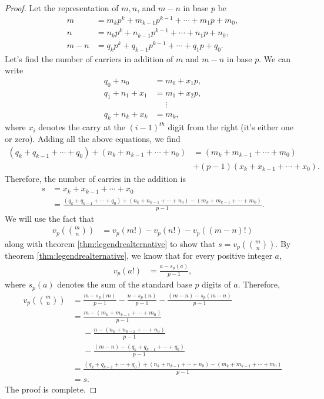 \documentclass[12pt]{subfile}
\begin{document}
\begin{proof}
	Let the representation of $m, n$, and $m-n$ in base $p$ be
	\begin{align*}
	m   &= m_kp^k+m_{k-1}p^{k-1}+\cdots +m_1p+m_0,\\
	n   &= n_kp^k+n_{k-1}p^{k-1}+\cdots +n_1p+n_0,\\
	m-n &= q_kp^k+q_{k-1}p^{k-1}+\cdots +q_1p+q_0.
	\end{align*}
	Let's find the number of carriers in addition of $m$ and $m-n$ in base $p$. We can write
	\begin{align*}
	q_0+n_0  &= m_0 + x_1 p,\\
	q_1+n_1+x_1&= m_1 + x_2p,\\
	&\phantom{=}\vdots\\
	q_k+n_k+x_k&= m_k,
	\end{align*}
	where $x_i$ denotes the carry at the $(i-1)^{th}$ digit from the right (it's either one or zero). Adding all the above equations, we find
	\begin{align*}
	(q_k+q_{k-1}+\cdots+q_0)+(n_k+n_{k-1}+\cdots+n_0) &= (m_k+m_{k-1}+ \cdots+m_0)\\&+(p-1)(x_k+x_{k-1}+\cdots+x_0).
	\end{align*}
	Therefore, the number of carries in the addition is
	\begin{align*}
	s &= x_k+x_{k-1}+\cdots+x_0 \\
	&= \frac{(q_k+q_{k-1}+\cdots+q_0) + (n_k+n_{k-1}+\cdots+n_0) - (m_k+m_{k-1}+\cdots+m_0)}{p-1}.
	\end{align*}
	We will use the fact that 
	\begin{align*}
	v_p\left( \binom{m}{n}\right) &= v_p(m!)-v_p(n!)-v_p((m-n)!)
	\end{align*}
	along with theorem \eqref{thm:legendrealternative} to show that $s=v_p\left( \binom{m}{n}\right)$. By theorem \eqref{thm:legendrealternative}, we know that for every positive integer $a$,
	\begin{align*}
	v_p(a!) & =\frac{a-s_p(a)}{p-1},
	\end{align*}
	where $s_p(a)$ denotes the sum of the standard base $p$ digits of $a$. Therefore,
	\begin{align*}
	v_p\left( \binom{m}{n}\right) &= \frac{m-s_p(m)}{p-1} - \frac{n-s_p(n)}{p-1} - \frac{(m-n)-s_p(m-n)}{p-1}\\
	&= \frac{m-(m_k+m_{k-1}+\cdots+m_0)}{p-1} \\&\phantom{=}-\frac{n-(n_k+n_{k-1}+\cdots+n_0)}{p-1} \\&\phantom{=}-\frac{(m-n)-(q_k+q_{k-1}+\cdots+q_0)}{p-1}\\
	&= \frac{(q_k+q_{k-1}+\cdots+q_0) + (n_k+n_{k-1}+\cdots+n_0) - (m_k+m_{k-1}+\cdots+m_0)}{p-1}\\
	&=s.
	\end{align*}
	The proof is complete.
\end{proof}
\end{document}

